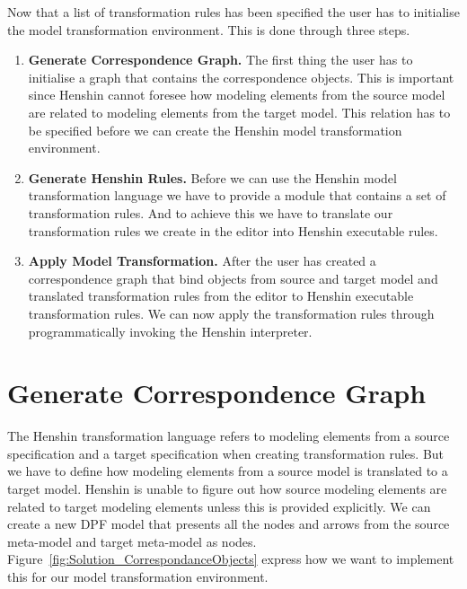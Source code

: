 Now that a list of transformation rules has been specified the user has to
initialise the model transformation environment. This is done through three
steps. 

\begin{enumerate}

\item \textbf{Generate Correspondence Graph.} The first thing the user has to
initialise a graph that contains the correspondence objects. This is important since
Henshin cannot foresee how modeling elements from the source model are related
to modeling elements from the target model. This relation has to be specified
before we can create the Henshin model transformation environment. 

\item \textbf{Generate Henshin Rules.} Before we can use the Henshin model
transformation language we have to provide a module that contains a set of transformation
rules. And to achieve this we have to translate our transformation rules we
create in the editor into Henshin executable rules. 

\item \textbf{Apply Model Transformation.} After the user has created a
correspondence graph that bind objects from source and target model and
translated transformation rules from the editor to Henshin executable
transformation rules. We can now apply the transformation rules through
programmatically invoking the Henshin interpreter.

\end{enumerate}


\section{Generate Correspondence Graph}

The Henshin transformation language refers to modeling elements from a source
specification and a target specification when creating transformation rules. But
we have to define how modeling elements from a source model is translated to a
target model. Henshin is unable to figure out how source modeling elements are
related to target modeling elements unless this is provided explicitly. We can
create a new DPF model that presents all the nodes and arrows from the source
meta-model and target meta-model as nodes.
Figure~\ref{fig:Solution_CorrespondanceObjects} express how we want to implement
this for our model transformation environment.

